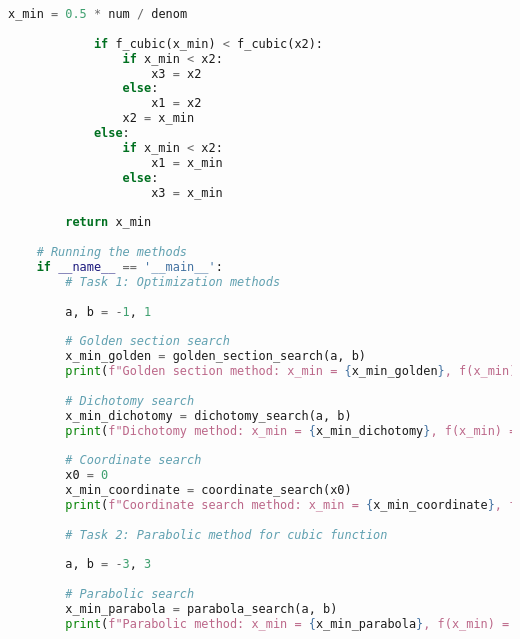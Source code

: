 \documentclass[a4paper,12pt]{article}
\begin{document}
\begin{lstlisting}[language=Python]
            x_min = 0.5 * num / denom
            
            if f_cubic(x_min) < f_cubic(x2):
                if x_min < x2:
                    x3 = x2
                else:
                    x1 = x2
                x2 = x_min
            else:
                if x_min < x2:
                    x1 = x_min
                else:
                    x3 = x_min
        
        return x_min
    
    # Running the methods
    if __name__ == '__main__':
        # Task 1: Optimization methods
        
        a, b = -1, 1
        
        # Golden section search
        x_min_golden = golden_section_search(a, b)
        print(f"Golden section method: x_min = {x_min_golden}, f(x_min) = {f(x_min_golden)}")
        
        # Dichotomy search
        x_min_dichotomy = dichotomy_search(a, b)
        print(f"Dichotomy method: x_min = {x_min_dichotomy}, f(x_min) = {f(x_min_dichotomy)}")
        
        # Coordinate search
        x0 = 0
        x_min_coordinate = coordinate_search(x0)
        print(f"Coordinate search method: x_min = {x_min_coordinate}, f(x_min) = {f(x_min_coordinate)}")
        
        # Task 2: Parabolic method for cubic function
        
        a, b = -3, 3
        
        # Parabolic search
        x_min_parabola = parabola_search(a, b)
        print(f"Parabolic method: x_min = {x_min_parabola}, f(x_min) = {f_cubic(x_min_parabola)}")
    \end{lstlisting}
    
    
\end{document}
